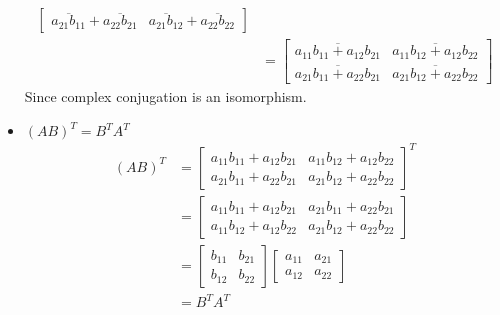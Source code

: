 \documentclass[12pt]{article}
\begin{document}
\begin{itemize}
\begin{align*}
\begin{bmatrix}
            \overline{a_{21}b_{11}} + \overline{a_{22}b_{21}} & \overline{a_{21}b_{12}} + \overline{a_{22}b_{22}}
        \end{bmatrix}\\
        &= \begin{bmatrix}
            \overline{a_{11}b_{11} + a_{12}b_{21}} & \overline{a_{11}b_{12} + a_{12}b_{22}} \\
            \overline{a_{21}b_{11} + a_{22}b_{21}} & \overline{a_{21}b_{12} + a_{22}b_{22}}
        \end{bmatrix}
    \end{align*}
    Since complex conjugation is an isomorphism. 
    \item \((AB)^T = B^T A^T\)
    \begin{align*}
        (AB)^T &= \begin{bmatrix}
            a_{11}b_{11} + a_{12}b_{21} & a_{11}b_{12} + a_{12}b_{22} \\
            a_{21}b_{11} + a_{22}b_{21} & a_{21}b_{12} + a_{22}b_{22}
        \end{bmatrix}^T \\
        &= \begin{bmatrix}
            a_{11}b_{11} + a_{12}b_{21} & a_{21}b_{11} + a_{22}b_{21} \\
            a_{11}b_{12} + a_{12}b_{22} & a_{21}b_{12} + a_{22}b_{22}
        \end{bmatrix} \\
        &= \begin{bmatrix}
            b_{11} & b_{21} \\
            b_{12} & b_{22}
        \end{bmatrix} \begin{bmatrix}
            a_{11} & a_{21} \\
            a_{12} & a_{22}
        \end{bmatrix} \\
        &= B^T A^T
    \end{align*}
\end{itemize}
\end{document}
